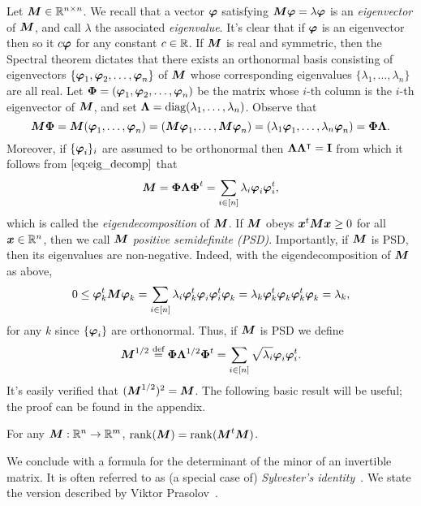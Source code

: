 Let ${\vb*{M}}\in\mathbb{R}^{n\times n}$. We recall that a vector $\vb*{\varphi}$ satisfying ${\vb*{M}}\vb*{\varphi}=\lambda\vb*{\varphi}$ is an \emph{eigenvector} of ${\vb*{M}}$, and call $\lambda$ the associated \emph{eigenvalue}. It's clear that if $\vb*{\varphi}$ is an eigenvector then so it $c\vb*{\varphi}$ for any constant $c\in \mathbb{R}$. If ${\vb*{M}}$ is real and symmetric, then the Spectral theorem dictates that there exists an orthonormal basis consisting of eigenvectors $\{\vb*{\varphi}_1,\vb*{\varphi}_2,\dots,\vb*{\varphi}_n\}$ of ${\vb*{M}}$ whose corresponding eigenvalues $\{\lambda_1,\dots,\lambda_n\}$ are all real. Let $\boldsymbol{\Phi}=(\vb*{\varphi}_1,\vb*{\varphi}_2,\dots,\vb*{\varphi}_n)$ be the matrix whose $i$-th column is the $i$-th eigenvector of ${\vb*{M}}$, and set $\vb{\Lambda}=\text{diag}(\lambda_1,\dots,\lambda_n)$. Observe that 
\begin{equation}
\label{eq:eig_decomp}
{\vb*{M}}\boldsymbol{\Phi}={\vb*{M}}(\vb*{\varphi}_1,\dots,\vb*{\varphi}_n)=({\vb*{M}}\vb*{\varphi}_1,\dots,{\vb*{M}}\vb*{\varphi}_n)=(\lambda_1\vb*{\varphi}_1,\dots,\lambda_n\vb*{\varphi}_n)=\boldsymbol{\Phi}\vb{\Lambda}.
\end{equation}
Moreover, if $\{\vb*{\varphi}_i\}_i$ are assumed to be orthonormal then $\vb{\Lambda}\vb{\Lambda}^\intercal=\vb{I}$ from which it follows from $\eqref{eq:eig_decomp}$ that \begin{equation}
    \label{eq:eig_decomp2}
    {\vb*{M}}=\boldsymbol{\Phi}\vb{\Lambda}\boldsymbol{\Phi}^t = \sum_{i\in[n]}\lambda_i\vb*{\varphi}_i\vb*{\varphi}_i^t,
\end{equation}
which is called the \emph{eigendecomposition} of ${\vb*{M}}$. 
If ${\vb*{M}}$ obeys  $\vb*{x}^t{\vb*{M}}\vb*{x}\geq 0$ for all  $\vb*{x}\in\mathbb{R}^n$, then we  call ${\vb*{M}}$ \emph{positive semidefinite (PSD)}. Importantly, if ${\vb*{M}}$ is PSD, then its eigenvalues are non-negative. Indeed, with the  eigendecomposition of ${\vb*{M}}$ as  above,  
\[0\leq \vb*{\varphi}_k^t {\vb*{M}}\vb*{\varphi}_k =\sum_{i\in[n]}\lambda_i \vb*{\varphi}_k^t\vb*{\varphi}_i\vb*{\varphi}_i^t\vb*{\varphi}_k = \lambda_k\vb*{\varphi}_k^t\vb*{\varphi}_k\vb*{\varphi}_k^t\vb*{\varphi}_k=\lambda_k,\]
for any $k$ since $\{\vb*{\varphi}_i\}$ are orthonormal. Thus,  if  ${\vb*{M}}$ is PSD we define 
\begin{equation*}
    {\vb*{M}}^{1/2} \overset{\text{def}}{=} \boldsymbol{\Phi}\vb{\Lambda}^{1/2}\boldsymbol{\Phi}^t = \sum_{i\in[n]}\sqrt{\lambda_i}\vb*{\varphi}_i\vb*{\varphi}_i^t.
\end{equation*}
It's easily verified that $({\vb*{M}}^{1/2})^2 = {\vb*{M}}$. The following basic  result will be useful; the proof can  be found in the appendix. 

\begin{lemma}
	\label{lem:rank(QtQ)}
	For any ${\vb*{M}}:\mathbb{R}^n\to\mathbb{R}^m$, $\rank({\vb*{M}}) = \rank({\vb*{M}}^t{\vb*{M}})$. 
\end{lemma}

We conclude with a formula for  the determinant of the minor of an invertible matrix.  It is often referred to as (a special  case of) \emph{Sylvester's identity}~\cite{sylvester1851xxxvii}. We state the version described by Viktor Prasolov~\cite{prasolov1994problems}. 


